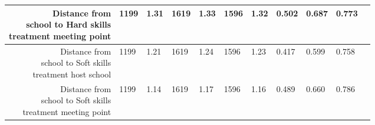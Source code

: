 \begin{longtable}{|r|l|l|l|l|l|l|l|l|l|l}
\hline

	 \makecell{Distance from\\ school to Hard skills\\ treatment meeting point}        & 1199                                                               &  1.31                                                              & 1619                                                               &  1.33                                                              & 1596                                                               &  1.32                                                              & 0.502                                                              & 0.687                                                              & 0.773                                                             \\

\hline

	 \makecell{Distance from\\ school to Soft skills\\ treatment host school}          & 1199                                                               &  1.21                                                              & 1619                                                               &  1.24                                                              & 1596                                                               &  1.23                                                              & 0.417                                                              & 0.599                                                              & 0.758                                                             \\

\hline

	 \makecell{Distance from\\ school to Soft skills\\ treatment meeting point}        & 1199                                                               &  1.14                                                              & 1619                                                               &  1.17                                                              & 1596                                                               &  1.16                                                              & 0.489                                                              & 0.660                                                              & 0.786                                                             \\

\hline
\end{longtable}


